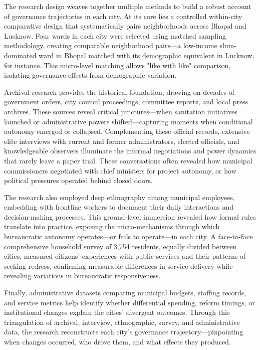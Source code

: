 The research design weaves together multiple methods to build a robust account of governance trajectories in each city. At its core lies a controlled within-city comparative design that systematically pairs neighborhoods across Bhopal and Lucknow. Four wards in each city were selected using matched sampling methodology, creating comparable neighborhood pairs—a low-income slum-dominated ward in Bhopal matched with its demographic equivalent in Lucknow, for instance. This micro-level matching allows "like with like" comparison, isolating governance effects from demographic variation.

Archival research provides the historical foundation, drawing on decades of government orders, city council proceedings, committee reports, and local press archives. These sources reveal critical junctures—when sanitation initiatives launched or administrative powers shifted—capturing moments when conditional autonomy emerged or collapsed. Complementing these official records, extensive elite interviews with current and former administrators, elected officials, and knowledgeable observers illuminate the informal negotiations and power dynamics that rarely leave a paper trail. These conversations often revealed how municipal commissioners negotiated with chief ministers for project autonomy, or how political pressures operated behind closed doors.

The research also employed deep ethnography among municipal employees, embedding with frontline workers to document their daily interactions and decision-making processes. This ground-level immersion revealed how formal rules translate into practice, exposing the micro-mechanisms through which bureaucratic autonomy operates—or fails to operate—in each city. A face-to-face comprehensive household survey of 3,754 residents, equally divided between cities, measured citizens' experiences with public services and their patterns of seeking redress, confirming measurable differences in service delivery while revealing variations in bureaucratic responsiveness.

Finally, administrative datasets comparing municipal budgets, staffing records, and service metrics help identify whether differential spending, reform timings, or institutional changes explain the cities' divergent outcomes. Through this triangulation of archival, interview, ethnographic, survey, and administrative data, the research reconstructs each city's governance trajectory—pinpointing when changes occurred, who drove them, and what effects they produced.

